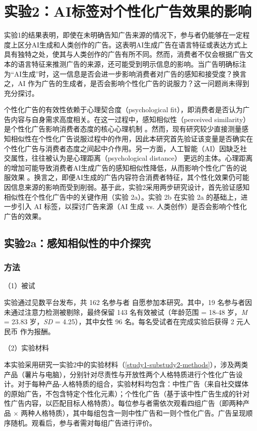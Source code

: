 \section{实验2：AI标签对个性化广告效果的影响}
实验1的结果表明，即使在未明确告知广告来源的情况下，参与者仍能够在一定程度上区分AI生成和人类创作的广告。这表明AI生成广告在语言特征或表达方式上具有独特之处，使其与人类创作的广告有所不同。然而，消费者不仅会根据广告文本的语言特征来推测广告的来源，还可能受到明示信息的影响。当广告明确标注为“AI生成”时，这一信息是否会进一步影响消费者对广告的感知和接受度？换言之，AI 作为广告的生成者，是否会影响个性化广告的说服力？这一问题尚未得到充分探讨。

个性化广告的有效性依赖于心理契合度（psychological fit），即消费者是否认为广告内容与自身需求高度相关。在这一过程中，感知相似性（perceived similarity） 是个性化广告影响消费者态度的核心心理机制 \citep{teeny2021review}。然而，现有研究较少直接测量感知相似性在个性化广告说服过程中的作用，因此本研究首先验证该变量是否确实在个性化广告与消费者态度之间起中介作用。另一方面，人工智能（AI）因缺乏社交属性，往往被认为是心理距离（psychological distance） 更远的主体\citep{kim2020artificial}。心理距离的增加可能导致消费者AI生成广告的感知相似性降低，从而影响个性化广告的说服效果 \citep{ahn2021ai}。换言之，即便AI生成的广告内容符合消费者特征，其个性化效果仍可能因信息来源的影响而受到削弱。基于此，实验2采用两步研究设计，首先验证感知相似性在个性化广告中的关键作用（实验 2a）。实验 2b 在实验 2a 的基础上，进一步引入 AI 标签，以探讨广告来源（AI 生成 vs. 人类创作）是否会影响个性化广告的效果。

\subsection{实验2a：感知相似性的中介探究}
\subsubsection{方法}
（1）被试

实验通过见数平台发布，共 162 名参与者 自愿参加本研究。其中，19 名参与者因未通过注意力检测被剔除，最终保留 143 名有效被试（年龄范围 = 18-48 岁，\textit{M} = 23.83 岁，\textit{SD} = 4.25），其中女性 96 名。每名受试者在完成实验后获得 2 元人民币 作为报酬。

（2）实验材料

本实验采用研究一实验2中的实验材料（\ref{study1-substudy2-methods}），涉及两类产品（薯片与电脑），分别针对尽责性与开放性两个人格特质进行个性化广告设计。对于每种产品-人格特质的组合，实验材料均包含：中性广告（来自社交媒体的原始广告，不包含特定个性化元素）；个性化广告（基于该中性广告生成的针对性广告内容，以匹配目标人格特质）。每位参与者需依次观看四组广告（即两种产品 × 两种人格特质），其中每组包含一则中性广告和一则个性化广告。广告呈现顺序随机。观看后，参与者需对每组广告进行评价。

